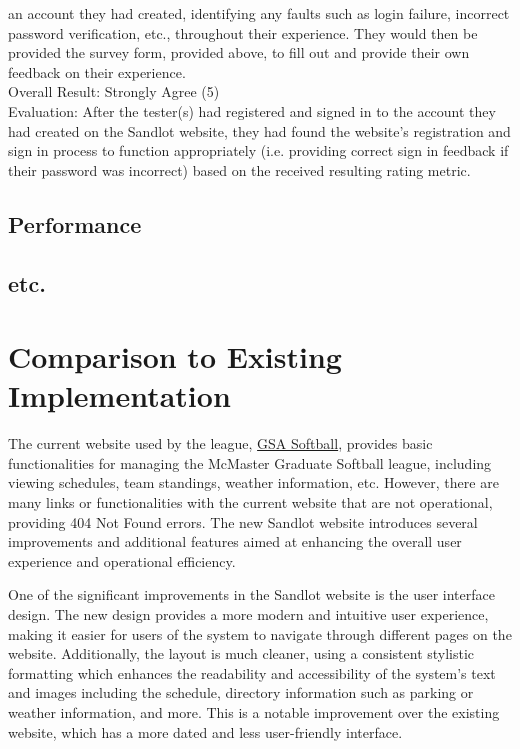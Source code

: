 \documentclass[12pt, titlepage]{article}
\begin{document}
\begin{enumerate}
  an account they had created, identifying any faults such as login failure, incorrect
  password verification, etc., throughout their experience. They would then be provided the survey form, provided above, to fill
  out and provide their own feedback on their experience. \\
  Overall Result: Strongly Agree (5)\\
  Evaluation: After the tester(s) had registered and signed in to the account they had
  created on the Sandlot website, they had found the website's registration and sign in process
  to function appropriately (i.e. providing correct sign in feedback if their password was
  incorrect) based on the received resulting rating metric.
\end{enumerate}
		
\subsection{Performance}

\subsection{etc.}
	
\section{Comparison to Existing Implementation}	

The current website used by the league, \href{https://www.gsasoftball.ca/}{GSA Softball},
provides basic functionalities for managing the McMaster Graduate Softball league, including
viewing schedules, team standings, weather information, etc. However, there are many links
or functionalities with the current website that are not operational, providing 404 Not Found errors.
The new Sandlot website introduces several improvements and additional features aimed at
enhancing the overall user experience and operational efficiency.

One of the significant improvements in the Sandlot website is the user interface design.
The new design provides a more modern and intuitive user experience, making it easier for
users of the system to navigate through different pages on the website. Additionally, the
layout is much cleaner, using a consistent stylistic formatting which enhances the readability
and accessibility of the system's text and images including the schedule, directory information
such as parking or weather information, and more. This is a notable improvement over the
existing website, which has a more dated and less user-friendly interface.
\end{document}
